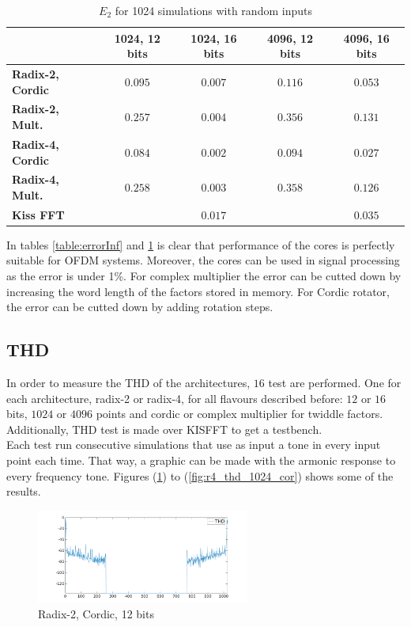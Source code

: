 \documentclass[conference]{IEEEtran}
\begin{document}
\begin{table}[htb!]
\begin{tabular}{l c c c c }
 & \textbf{1024, 12 bits} & \textbf{1024, 16 bits} & \textbf{4096, 12 bits} & \textbf{4096, 16 bits}\\ \hline 
\textbf{Radix-2, Cordic} & $0.095$ & $0.007$ & $0.116$ & $0.053$\\
\textbf{Radix-2, Mult.} & $0.257$ & $0.004$ & $0.356$ & $0.131$\\
\textbf{Radix-4, Cordic} & $0.084$ & $0.002$ & $0.094$ & $0.027$\\
\textbf{Radix-4, Mult.} & $0.258$ & $0.003$ & $0.358$ & $0.126$\\ 
\textbf{Kiss FFT} & $ $ & $0.017$ & $ $ & $0.035$\\\hline
\end{tabular}
\caption{$E_2$ for 1024 simulations with random inputs}
\label{table:error2}
\end{table}
 
In tables \ref{table:errorInf} and \ref{table:error2} is clear that performance of the cores is perfectly suitable for OFDM systems. Moreover, 
the cores can be used in signal processing as the error is under 1\%. For complex multiplier the error can be cutted down by increasing the word 
length of the factors stored in memory. For Cordic rotator, the error can be cutted down by adding rotation steps.\\

\subsection{THD}

In order to measure the THD of the architectures, $16$ test are performed. One for each architecture, radix-2 or radix-4, for all flavours 
described before: $12$ or $16$ bits, $1024$ or $4096$ points and cordic or complex multiplier for twiddle factors. Additionally, THD test is made 
over KISFFT to get a testbench.\\
Each test run consecutive simulations that use as input a tone in every input point each time. That way, a graphic can be made with 
the armonic response to every frequency tone. Figures (\ref{fig:r2_thd_1024_cor}) to (\ref{fig:r4_thd_1024_cor}) shows some of the 
results.\\

\begin{figure}[Htb!]
        \centering
        \includegraphics[width=7cm]{./figures/thd_r2_1024_12_cor.png}
        \caption{Radix-2, Cordic, 12 bits}
        \label{fig:r2_thd_1024_cor}
\end{figure}
\end{document}
